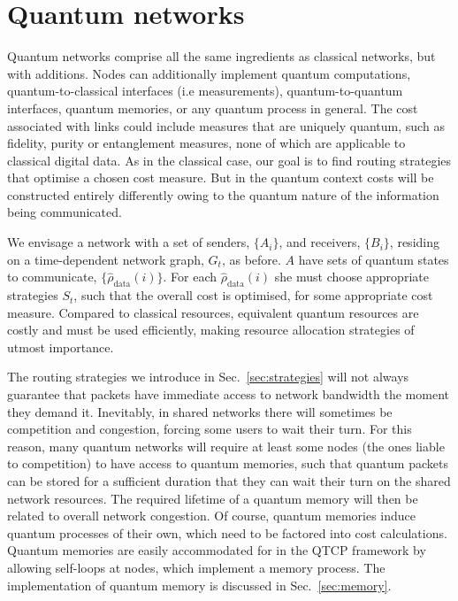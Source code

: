 \documentclass[aps,rmp,twocolumn,amsmath,amssymb,nofootinbib,superscriptaddress,longbibliography,floatfix,table-of-contents,eqsecnum]{revtex4-1}
\begin{document}
\section{Quantum networks} \label{sec:quant_net} 

Quantum networks comprise all the same ingredients as classical networks, but with additions. Nodes can additionally implement quantum computations, quantum-to-classical interfaces (i.e measurements), quantum-to-quantum interfaces, quantum memories, or any quantum process in general. The cost associated with links could include measures that are uniquely quantum, such as fidelity, purity or entanglement measures, none of which are applicable to classical digital data. As in the classical case, our goal is to find routing strategies that optimise a chosen cost measure. But in the quantum context costs will be constructed entirely differently owing to the quantum nature of the information being communicated.

We envisage a network with a set of senders, $\{A_i\}$, and receivers, $\{B_i\}$, residing on a time-dependent network graph, $G_t$, as before. $A$ have sets of quantum states to communicate, $\{\hat\rho_\text{data}(i)\}$. For each $\hat\rho_\text{data}(i)$ she must choose appropriate strategies $S_t$, such that the overall cost is optimised, for some appropriate cost measure. Compared to classical resources, equivalent quantum resources are costly and must be used efficiently, making resource allocation strategies of utmost importance.

The routing strategies we introduce in Sec.~\ref{sec:strategies} will not always guarantee that packets have immediate access to network bandwidth the moment they demand it. Inevitably, in shared networks there will sometimes be competition and congestion, forcing some users to wait their turn. For this reason, many quantum networks will require at least some nodes (the ones liable to competition) to have access to quantum memories, such that quantum packets can be stored for a sufficient duration that they can wait their turn on the shared network resources. The required lifetime of a quantum memory will then be related to overall network congestion. Of course, quantum memories induce quantum processes of their own, which need to be factored into cost calculations. Quantum memories are easily accommodated for in the QTCP framework by allowing self-loops at nodes, which implement a memory process. The implementation of quantum memory is discussed in Sec.~\ref{sec:memory}.
\end{document}
